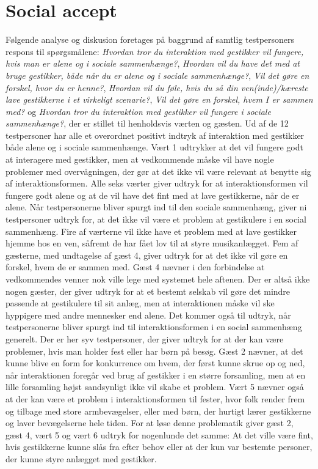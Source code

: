 \section{Social accept}
\label{TestresultaterSocialAcceptSocial}
%
Følgende analyse og diskusion foretages på baggrund af samtlig testpersoners respons til spørgsmålene: \textit{Hvordan tror du interaktion med gestikker vil fungere, hvis man er alene og i sociale sammenhænge?}, \textit{Hvordan vil du have det med at bruge gestikker, både når du er alene og i sociale sammenhænge?}, \textit{Vil det gøre en forskel, hvor du er henne?}, \textit{Hvordan vil du føle, hvis du så din ven(inde)/kæreste lave gestikkerne i et virkeligt scenarie?}, \textit{Vil det gøre en forskel, hvem I er sammen med?} og \textit{Hvordan tror du interaktion med gestikker vil fungere i sociale sammenhænge?}, der er stillet til henholdsvis værten og gæsten. \blankline
%
Ud af de 12 testpersoner har alle et overordnet positivt indtryk af interaktion med gestikker både alene og i sociale sammenhænge. Vært 1 udtrykker at det vil fungere godt at interagere med gestikker, men at vedkommende måske vil have nogle problemer med overvågningen, der gør at det ikke vil være relevant at benytte sig af interaktionsformen. Alle seks værter giver udtryk for at interaktionsformen vil fungere godt alene og at de vil have det fint med at lave gestikkerne, når de er alene. Når testpersonerne bliver spurgt ind til den sociale sammenhæng, giver ni testpersoner udtryk for, at det ikke vil være et problem at gestikulere i en social sammenhæng. Fire af værterne vil ikke have et problem med at lave gestikker hjemme hos en ven, såfremt de har fået lov til at styre musikanlægget. Fem af gæsterne, med undtagelse af gæst 4, giver udtryk for at det ikke vil gøre en forskel, hvem de er sammen med. Gæst 4 nævner i den forbindelse at vedkommendes venner nok ville lege med systemet hele aftenen. Der er altså ikke nogen gæster, der giver udtryk for at et bestemt selskab vil gøre det mindre passende at gestikulere til sit anlæg, men at interaktionen måske vil ske hyppigere med andre mennesker end alene. Det kommer også til udtryk, når testpersonerne bliver spurgt ind til interaktionsformen i en social sammenhæng generelt. Der er her syv testpersoner, der giver udtryk for at der kan være problemer, hvis man holder fest eller har børn på besøg. Gæst 2 nævner, at det kunne blive en form for konkurrence om hvem, der først kunne skrue op og ned, når interaktionen foregår ved brug af gestikker i en større forsamling, men at en lille forsamling højst sandsynligt ikke vil skabe et problem. Vært 5 nævner også at der kan være et problem i interaktionsformen til fester, hvor folk render frem og tilbage med store armbevægelser, eller med børn, der hurtigt lærer gestikkerne og laver bevægelserne hele tiden. For at løse denne problematik giver gæst 2, gæst 4, vært 5 og vært 6 udtryk for nogenlunde det samme: At det ville være fint, hvis gestikkerne kunne slås fra efter behov eller at der kun var bestemte personer, der kunne styre anlægget med gestikker. 

